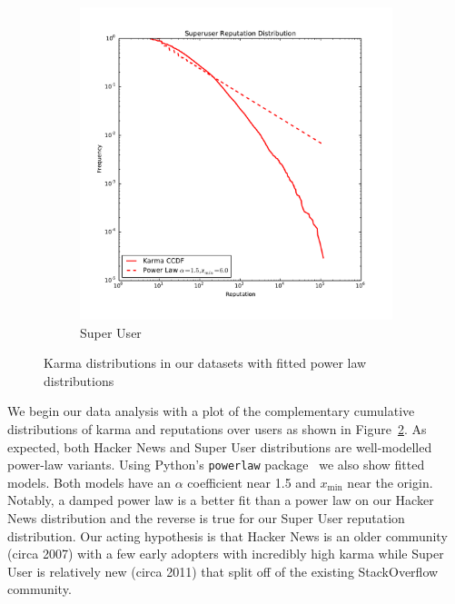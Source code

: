 \documentclass[10pt]{article}
\begin{document}
\begin{figure}[h]
\begin{subfigure}{0.49\textwidth}
\includegraphics[width=\linewidth]{su_karma_distribution}
\caption{Super User}
\label{fig:sukarma}
\end{subfigure}
\caption{Karma distributions in our datasets with fitted power law distributions}
\label{fig:karma}
\end{figure}

We begin our data analysis with a plot of the complementary cumulative
distributions of karma and reputations over users as shown in
Figure~\ref{fig:karma}. As expected, both Hacker News and Super User
distributions are well-modelled power-law variants. Using Python's
\texttt{powerlaw} package~\cite{alstott_powerlaw:_2013} we also show fitted
models. Both models have an $\alpha$ coefficient near 1.5 and $x_{\text{min}}$
near the
origin. Notably, a damped power law is a better fit than a power law on our
Hacker News distribution and the reverse is true for our Super User reputation
distribution.  Our acting hypothesis is that Hacker News is an older community
(circa 2007) with a few early adopters with incredibly high karma while Super
User is relatively new (circa 2011) that split off of the existing StackOverflow
community.
\end{document}
